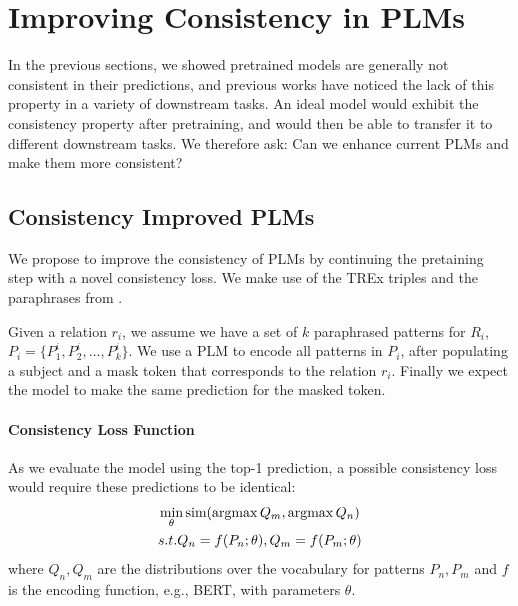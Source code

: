 \section{Improving Consistency in PLMs}
\label{sec:adding_consistency}

In the previous sections, we showed pretrained models are generally not consistent in their predictions, and previous works have noticed the lack of this property in a variety of downstream tasks.
An ideal model would exhibit the consistency property after pretraining, and would then be able to transfer it to different downstream tasks. We therefore ask:
Can we enhance current PLMs and make them more consistent?

\subsection{Consistency Improved PLMs}
We propose to improve the consistency of PLMs by continuing the pretaining step with a novel consistency loss. %
We make use of the TREx triples and the paraphrases from \resource{}.

Given a relation $r_i$, we
assume we have a set of $k$ paraphrased patterns for $R_i$,
$P_i=\{P_1^i, P_2^i, \dots, P_k^i\}$.
We use a PLM to encode all patterns in $P_i$, after populating a subject and a mask token that corresponds to the relation $r_i$. Finally we expect the model to make the same prediction for the masked token.


\paragraph{Consistency Loss Function}
As we evaluate the model using the top-1 prediction, a possible consistency loss would require these predictions to be identical:
\begin{gather*} 
\min_{\theta} \mbox{sim}(\operatorname*{argmax} Q_m, \operatorname*{argmax} Q_n)\\
s.t. Q_n = f(P_n; \theta), Q_m = f(P_m; \theta)
\end{gather*}
where $Q_n,Q_m$ are the distributions over the vocabulary for patterns $P_n,P_m$  and $f$ is the encoding function, e.g., BERT, with parameters $\theta$.


